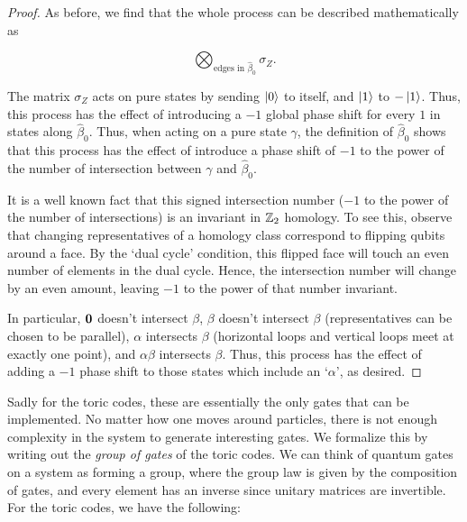 \documentclass{article}
\theoremstyle{definition}
\numberwithin{figure}{section}
\begin{document}
\begin{proof}
As before, we find that the whole process can be described mathematically as

$$\bigotimes_{\text{edges in }\widehat{\beta}_0}\sigma_Z.$$

The matrix $\sigma_Z$ acts on pure states by sending $\left|0\right>$ to itself, and $\left|1\right>$ to $-\left|1\right>$. Thus, this process has the effect of introducing a $-1$ global phase shift for every $1$ in states along $\widehat{\beta}_0$. Thus, when acting on a pure state $\gamma$, the definition of $\widehat{\beta}_0$ shows that this process has the effect of introduce a phase shift of $-1$ to the power of the number of intersection between $\gamma$ and $\widehat{\beta}_0$.

It is a well known fact that this signed intersection number ($-1$ to the power of the number of intersections) is an invariant in $\mathbb{Z}_2$ homology. To see this, observe that changing representatives of a homology class correspond to flipping qubits around a face. By the `dual cycle' condition, this flipped face will touch an even number of elements in the dual cycle. Hence, the intersection number will change by an even amount, leaving $-1$ to the power of that number invariant.

In particular, $\bold{0}$ doesn't intersect $\beta$, $\beta$ doesn't intersect $\beta$ (representatives can be chosen to be parallel), $\alpha$ intersects $\beta$ (horizontal loops and vertical loops meet at exactly one point), and $\alpha\beta$ intersects $\beta$. Thus, this process has the effect of adding a $-1$ phase shift to those states which include an `$\alpha$', as desired.
\end{proof}

Sadly for the toric codes, these are essentially the only gates that can be implemented. No matter how one moves around particles, there is not enough complexity in the system to generate interesting gates. We formalize this by writing out the \textit{group of gates} of the toric codes. We can think of quantum gates on a system as forming a group, where the group law is given by the composition of gates, and every element has an inverse since unitary matrices are invertible. For the toric codes, we have the following:
\end{document}
